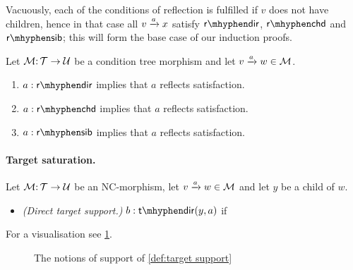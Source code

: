 Vacuously, each of the conditions of reflection is fulfilled if $v$ does not have children, hence in that case all ${v}\xrightarrow{a}{x}$ satisfy $\rdir$, $\rchd$ and $\rsib$; this will form the base case of our induction proofs.

\begin{lemma}\label{lem:source-saturation}
Let ${\mathcal{M}}{:}\,{\mathcal{T}}\rightarrow{\mathcal{U}}$ be a condition tree morphism and let ${v}\xrightarrow{a}{w}\in{\mathcal{M}}$.
\begin{enumerate}[topsep=\smallskipamount]
\item $a:\rdir$ implies that $a$ reflects satisfaction. 
\item $a:\rchd$ implies that $a$ reflects satisfaction. 
\item $a:\rsib$ implies that $a$ reflects satisfaction. 
\end{enumerate}
\end{lemma}

\paragraph{Target saturation.}

\begin{definition}\label{def:target support}
Let ${\mathcal{M}}{:}\, {\mathcal{T}}\rightarrow{\mathcal{U}}$ be an NC-morphism, let ${v}\xrightarrow{a}{w}\in{\mathcal{M}}$ and let $y$ be a child of $w$.
\begin{itemize}[topsep=\smallskipamount]
\item \emph{(Direct target support.)} $b:\tdir{y,a}$ if 
\end{itemize}
\end{definition}
%
For a visualisation see \cref{fig:target-saturation}.
%
\begin{figure}
	
	\caption{The notions of support of \cref{def:target support}}
	\label{fig:target-saturation}
\end{figure}

